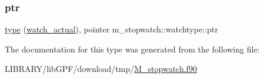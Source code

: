 \subsubsection{\texorpdfstring{ptr}{ptr}}
{\footnotesize\ttfamily \hyperlink{stop__watch_83_8txt_a70f0ead91c32e25323c03265aa302c1c}{type} (\hyperlink{structm__stopwatch_1_1watch__actual}{watch\+\_\+actual}), pointer m\+\_\+stopwatch\+::watchtype\+::ptr}



The documentation for this type was generated from the following file\+:\begin{DoxyCompactItemize}
\item 
L\+I\+B\+R\+A\+R\+Y/lib\+G\+P\+F/download/tmp/\hyperlink{M__stopwatch_8f90}{M\+\_\+stopwatch.\+f90}\end{DoxyCompactItemize}
